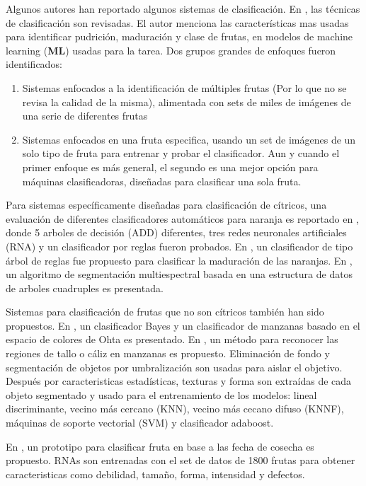 \documentclass[twoside,spanish,ESP,MSc]{plantillaLabUPV}
\theoremstyle{definition}
\begin{document}
Algunos autores han reportado algunos sistemas de clasificación. En \cite{7306754}, las técnicas de clasificación son revisadas. El autor menciona las características mas usadas para identificar pudrición, maduración y clase de frutas, en modelos de machine learning (\textbf{ML}) usadas para la tarea. Dos grupos grandes de enfoques fueron identificados: 


\begin{enumerate}
\itemsep 0em
 \item Sistemas enfocados a la identificación de múltiples frutas (Por lo que no se revisa la calidad de la misma), alimentada con sets de miles de imágenes de una serie de diferentes frutas 
 \item Sistemas enfocados en una fruta especifica, usando un set de imágenes de un solo tipo de fruta para entrenar y probar el clasificador. Aun y cuando el primer enfoque es más general, el segundo es una mejor opción para máquinas clasificadoras, diseñadas para clasificar una sola fruta.
\end{enumerate}

Para sistemas específicamente diseñadas para clasificación de cítricos, una evaluación de diferentes clasificadores automáticos para naranja es reportado en \cite{Mercol2008AutomaticCO}, donde 5 arboles de decisión (ADD) diferentes, tres redes neuronales artificiales (RNA) y un clasificador por reglas fueron probados. En \cite{sirisath}, un clasificador de tipo árbol de reglas fue propuesto para clasificar la maduración de las naranjas. En \cite{Martinez-Uso:2005:MIS:1565835.1565847}, un algoritmo de segmentación multiespectral basada en una estructura de datos de arboles cuadruples es presentada. 

Sistemas para clasificación de frutas que no son cítricos también han sido propuestos. En \cite{feng}, un clasificador Bayes y un clasificador de manzanas basado en el espacio de colores de Ohta es presentado. En \cite{UNAY2007597}, un método para reconocer las regiones de tallo o cáliz en manzanas es propuesto. Eliminación de fondo y segmentación de objetos por umbralización son usadas para aislar el objetivo. Después por caracteristicas estadísticas, texturas y forma son extraídas de cada objeto segmentado y usado para el entrenamiento de los modelos: lineal discriminante, vecino más cercano (KNN), vecino más cecano difuso (KNNF), máquinas de soporte vectorial (SVM) y clasificador adaboost.

En \cite{ALOHALI201129}, un prototipo para clasificar fruta en base a las fecha de cosecha es propuesto. RNAs son entrenadas con el set de datos de 1800 frutas para obtener caracteristicas como debilidad, tamaño, forma, intensidad y defectos.
\end{document}
